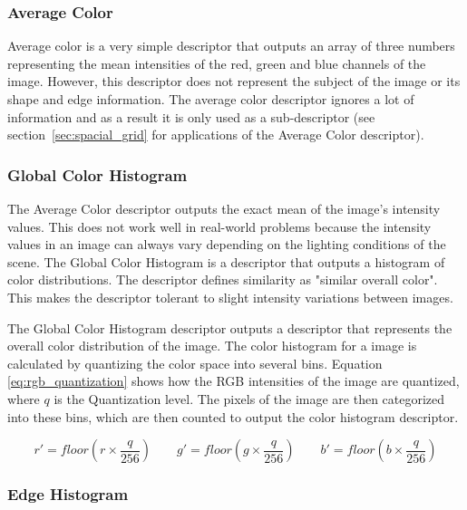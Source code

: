 \subsubsection{Average Color}
\label{sec:average_color}

Average color is a very simple descriptor that outputs an array of three numbers representing the mean intensities of
the red, green and blue channels of the image. However, this descriptor does not represent the subject of the image or
its shape and edge information. The average color descriptor ignores a lot of information and as a result it is only
used as a sub-descriptor (see section~\ref{sec:spacial_grid} for applications of the Average Color descriptor).

\subsubsection{Global Color Histogram}
\label{sec:global_color_histogram}

The Average Color descriptor outputs the exact mean of the image's intensity values. This does not work well in
real-world problems because the intensity values in an image can always vary depending on the lighting conditions of
the scene. The Global Color Histogram is a descriptor that outputs a histogram of color distributions. The descriptor
defines similarity as "similar overall color". This makes the descriptor tolerant to slight intensity variations
between images.

The Global Color Histogram \cite{colorhistforcbir} descriptor outputs a descriptor that represents the overall
color distribution of the image. The color histogram for a image is calculated by quantizing the color space into
several bins. Equation \ref{eq:rgb_quantization} shows how the RGB intensities of the image are quantized, where $q$
is the Quantization level. The pixels of the image are then categorized into these bins, which are then counted to
output the color histogram descriptor.

\begin{equation}
  r' = floor(r \times \frac{q}{256}) \qquad g' = floor(g \times \frac{q}{256}) \qquad b' = floor(b \times \frac{q}{256})
  \label{eq:rgb_quantization}
\end{equation}

\subsubsection{Edge Histogram}
\label{sec:edge_histogram}


